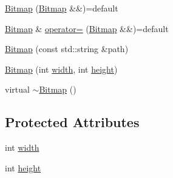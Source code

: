 \begin{DoxyCompactItemize}
\hyperlink{classZeta_1_1Bitmap_add684ebb8c0f5dc04376eb1ed760f8b7}{Bitmap} (\hyperlink{classZeta_1_1Bitmap}{Bitmap} \&\&)=default
\item 
\hyperlink{classZeta_1_1Bitmap}{Bitmap} \& \hyperlink{classZeta_1_1Bitmap_ace6923621ad08915460c840f12ec701a}{operator=} (\hyperlink{classZeta_1_1Bitmap}{Bitmap} \&\&)=default
\item 
\hyperlink{classZeta_1_1Bitmap_aa2abefaeb9204d8f0184c036984f8b2d}{Bitmap} (const std\+::string \&path)
\item 
\hyperlink{classZeta_1_1Bitmap_a1338d6c3b7eb2be1dccb247fbf9728c2}{Bitmap} (int \hyperlink{classZeta_1_1Bitmap_affa526cccd51b4ac5db7aac25ff7f6a9}{width}, int \hyperlink{classZeta_1_1Bitmap_a4d9a82acc6c418dc9b72227b0d63d9aa}{height})
\item 
virtual \hyperlink{classZeta_1_1Bitmap_a2a62cac74fb6f69afc519b026c63cb17}{$\sim$\+Bitmap} ()
\end{DoxyCompactItemize}
\subsection*{Protected Attributes}
\begin{DoxyCompactItemize}
\item 
int \hyperlink{classZeta_1_1Bitmap_affa526cccd51b4ac5db7aac25ff7f6a9}{width}
\item 
int \hyperlink{classZeta_1_1Bitmap_a4d9a82acc6c418dc9b72227b0d63d9aa}{height}
\end{DoxyCompactItemize}



